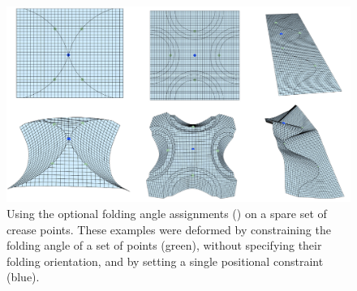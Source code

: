\begin{figure} [h]
	\centering
	\includegraphics[width=\linewidth]{figures/dihedral_editing}
	\caption{Using the optional folding angle assignments () on a spare set of crease points. These examples were deformed by constraining the folding angle of a set of points (green), without specifying their folding orientation, and by setting a single positional constraint (blue).}
	\label{fig:dihedral_editing}
\end{figure}